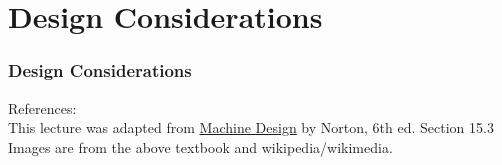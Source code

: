\documentclass[fleqn]{beamer} %
\newcommand{\sectiontitleV}{ Design Considerations}
\begin{document}
\section{\sectiontitleV}	

    \begin{frame}[label=sectionV] \small
	\frametitle{\sectiontitleV}    

  	

	\end{frame}

    \begin{frame}[label=sectionV] \small
  

	References: \vspace{10mm} \\

	This lecture was adapted from \underline{Machine Design} by Norton, 6th ed. Section 15.3 \vspace{10mm} \\
	
	Images are from the above textbook and wikipedia/wikimedia.

	\end{frame}
		
\end{document}
